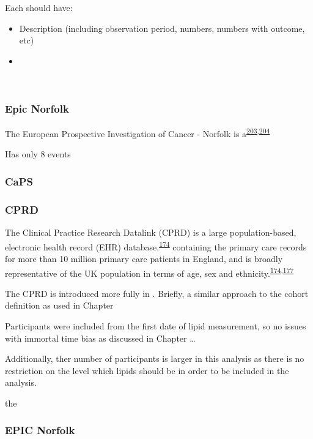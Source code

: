 \documentclass[a4paper, twoside]{templates/ociamthesis}
\providecommand{\tightlist}{%
  \setlength{\itemsep}{0pt}\setlength{\parskip}{0pt}}
\begin{document}
Each should have:

\begin{itemize}
\tightlist
\item
  Description (including observation period, numbers, numbers with outcome, etc)
\item
\end{itemize}

~

\hypertarget{epic-norfolk}{%
\subsubsection{Epic Norfolk}\label{epic-norfolk}}

The European Prospective Investigation of Cancer - Norfolk is a\textsuperscript{\protect\hyperlink{ref-riboli1997}{203},\protect\hyperlink{ref-riboli2002}{204}}

Has only 8 events

\hypertarget{caps}{%
\subsubsection{CaPS}\label{caps}}

\hypertarget{cprd}{%
\subsubsection{CPRD}\label{cprd}}

The Clinical Practice Research Datalink (CPRD) is a large population-based, electronic health record (EHR) database.\textsuperscript{\protect\hyperlink{ref-herrett2015}{174}} containing the primary care records for more than 10 million primary care patients in England, and is broadly representative of the UK population in terms of age, sex and ethnicity.\textsuperscript{\protect\hyperlink{ref-herrett2015}{174},\protect\hyperlink{ref-mathur2014}{177}}

The CPRD is introduced more fully in . Briefly, a similar approach to the cohort definition as used in Chapter

Participants were included from the first date of lipid measurement, so no issues with immortal time bias as discussed in Chapter \ldots{}

Additionally, ther number of participants is larger in this analysis as there is no restriction on the level which lipids should be in order to be included in the analysis.

the

\hypertarget{epic-norfolk-1}{%
\subsubsection{EPIC Norfolk}\label{epic-norfolk-1}}
\end{document}
